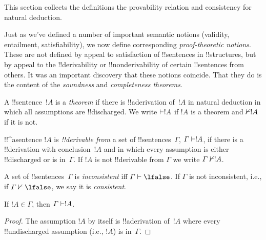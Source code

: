 \documentclass[../../../include/open-logic-section]{subfiles}
\begin{document}
      {}
      {}


\begin{editorial}
This section collects the definitions the provability relation
and consistency for natural deduction.
\end{editorial}

\begin{explain}
Just as we've defined a number of important semantic notions
(validity, entailment, satisfiability), we now define corresponding
\emph{proof-theoretic notions}.  These are not defined by appeal to
satisfaction of !!{sentence}s in !!{structure}s, but by appeal to the
!!{derivability} or !!{nonderivability} of certain !!{sentence}s from
others.  It was an important discovery that these notions coincide.
That they do is the content of the \emph{soundness} and
\emph{completeness theorems}.
\end{explain}


\begin{defn}[Theorems]
A !!{sentence}~$!A$ is a \emph{theorem} if there is !!a{derivation}
of~$!A$ in natural deduction in which all assumptions are
!!{discharged}.  We write $\Proves !A$ if $!A$ is a theorem and
$\Proves/ !A$ if it is not.
\end{defn}

\begin{defn}[!!^{derivability}]
!!^a{sentence} $!A$ is \emph{!!{derivable} from} a set of
!!{sentence}s~$\Gamma$, $\Gamma \Proves !A$, if there is a
!!{derivation} with conclusion~$!A$ and in which every assumption
is either !!{discharged} or is in~$\Gamma$. If $!A$ is not
!!{derivable} from $\Gamma$ we write $\Gamma \Proves/ !A$.
\end{defn}

\begin{defn}[Consistency]
A set of !!{sentence}s~$\Gamma$ is \emph{inconsistent} iff $\Gamma
\Proves \lfalse$.  If $\Gamma$ is not inconsistent, i.e., if
$\Gamma \Proves/ \lfalse$, we say it is \emph{consistent}.
\end{defn}

\begin{prop}[Reflexivity]
If $!A \in \Gamma$, then $\Gamma \Proves !A$.
\end{prop}

\begin{proof}
The assumption $!A$ by itself is !!a{derivation} of~$!A$ where every
!!{undischarged} assumption (i.e., $!A$) is in~$\Gamma$.
\end{proof}
  
\end{document}
